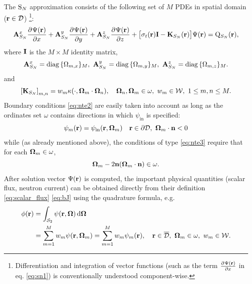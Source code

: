 The $\text{S}_{N}$ approximation consists of the
following set of $M$ PDEs in spatial domain ($\mathbf{r}\in\mathcal{D}$) \footnote{Differentiation and integration of vector functions
(such as the term $\frac{\partial^{}\Psi(\mathbf{r})}{\partial x^{}}$ in eq. \eqref{eq:sn1}) is conventionally understood component-wise.}:
\begin{equation}\label{eq:sn1} 
\mathbf{A}_{S_N}^x\frac{\partial^{}\Psi(\mathbf{r})}{\partial x^{}} + \mathbf{A}_{S_N}^y\frac{\partial^{}\Psi(\mathbf{r})}{\partial y^{}} +
\mathbf{A}_{S_N}^z\frac{\partial^{}\Psi(\mathbf{r})}{\partial z^{}} + \bigl[\sigma_t(\mathbf{r})\mathbf{I} - \mathbf{K}_{S_N}(\mathbf{r})\bigr]\Psi(\mathbf{r}) = \mathrm{Q}_{S_N}(\mathbf{r}),
\end{equation}
where $\mathbf{I}$ is the $M\times M$ identity matrix,
$$
	\mathbf{A}_{S_N}^x = \operatorname{diag\,}\{\Omega_{m,x}\}_{M},\ \mathbf{A}_{S_N}^y = \operatorname{diag\,}\{\Omega_{m,y}\}_{M},\
	\mathbf{A}_{S_N}^z = \operatorname{diag\,}\{\Omega_{m,z}\}_{M}.
$$
and
\begin{equation}\label{eq:SNK}
	\left[\mathbf{K}_{S_N}\right]_{m,n} = w_m \kappa(\cdot,\mathbf{\Omega}_m\cdot\mathbf{\Omega}_n),\quad
	\mathbf{\Omega}_n,\mathbf{\Omega}_m\in \omega,\ w_m\in \mathcal{W},\ 1 \leq m,n \leq M.
\end{equation}
Boundary conditions \eqref{eq:nte2} are easily taken into account as long as the ordinates set $\omega$ contains
directions in which $\psi_{\text{in}}$ is specified:
\begin{equation}\label{eq:bc_sn}
	\psi_m(\br) = \psi_{\text{in}}(\br, \bomega_m)\quad \br\in\pV, \ \bomega_m\cdot\bn < 0
\end{equation}	
while (as already mentioned above), the conditions of type
\eqref{eq:nte3} require that for each $\mathbf{\Omega}_m\in\omega$, 
$$
	\mathbf{\Omega}_m - 2 \mathbf{n} (\mathbf{\Omega}_m \cdot \mathbf{n}) \in \omega.
$$ 
After solution vector $\Psi(\mathbf{r})$ is computed, the
important physical quantities (scalar flux, neutron current) can be obtained directly from their definition \eqref{eq:scalar_flux}
\eqref{eq:bJ} using the quadrature formula, e.g.
\begin{equation}\label{eq:scalar_flux_sn}
\begin{aligned}
	\phi(\mathbf{r}) &= \int_{\mathcal{S}_2}\psi(\mathbf{r},\mathbf{\Omega})\,\text{d}\mathbf{\Omega}\,\\
	 &= \sum_{m=1}^{M} w_m \psi(\mathbf{r},\mathbf{\Omega}_m) = \sum_{m=1}^{M} w_m \psi_m(\mathbf{r}), \quad
	\mathbf{r}\in \overline{\mathcal{D}},\ \mathbf{\Omega}_m\in \omega,\ w_m\in \mathcal{W}.
\end{aligned}
\end{equation}


